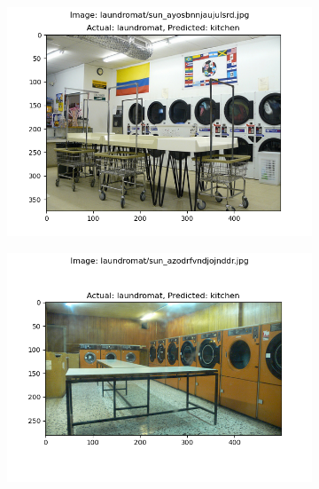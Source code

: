 \documentclass{article} %
\begin{document}
\begin{figure}[h]
\begin{subfigure}[b]{0.333\textwidth}
        \end{subfigure}
        \begin{subfigure}[b]{0.333\textwidth}
            \includegraphics[width=\textwidth]{q2,6_case_107.png}
        \end{subfigure}
        \begin{subfigure}[b]{0.333\textwidth}
            \includegraphics[width=\textwidth]{q2,6_case_117.png}
        \end{subfigure}
        \begin{subfigure}[b]{0.333\textwidth}

\end{subfigure}
\end{figure}
\end{document}
